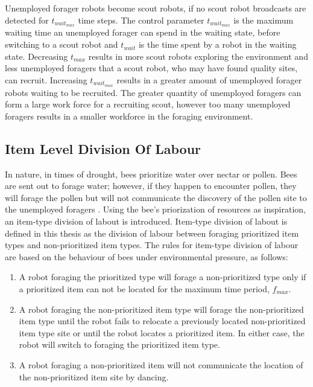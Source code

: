 Unemployed forager robots become scout robots, if no scout robot broadcasts are detected for $t_{wait_{max}}$ time steps. The control parameter $t_{wait_{max}}$ is the maximum waiting time an unemployed forager can spend in the waiting state, before switching to a scout robot and $t_{wait}$ is the time spent by a robot in the waiting state. Decreasing $t_{max}$ results in more scout robots exploring the environment and less unemployed foragers that a scout robot, who may have found quality sites, can recruit. Increasing $t_{wait_{max}}$ results in a greater amount of unemployed forager robots waiting to be recruited. The greater quantity of unemployed foragers can form a large work force for a recruiting scout, however too many unemployed foragers results in a smaller workforce in the foraging environment.


\subsection{Item Level Division Of Labour}
In nature, in times of drought, bees prioritize water over nectar or pollen. Bees are sent out to forage water; however, if they happen to encounter pollen, they will forage the pollen but will not communicate the discovery of the pollen site to the unemployed foragers  \cite{seeley2009wisdom}. Using the bee's priorization of resources as inspiration, an item-type division of labout is introduced. Item-type division of labout is defined in this thesis as the division of labour between foraging prioritized item types and non-prioritized item types.
The rules for item-type division of labour are based on the behaviour of bees under environmental pressure, as follows:

\begin{enumerate}
\item A robot foraging the prioritized type will forage a non-prioritized type only if a prioritized item can not be located for the maximum time period, $f_{max}$.
\item A robot foraging the non-prioritized item type will forage the non-prioritized item type until the robot fails to relocate a previously located non-prioritized item type site or until the robot locates a prioritized item. In either case, the robot will switch to foraging the prioritized item type.
\item A robot foraging a non-prioritized item will not communicate the location of the non-prioritized item site by dancing. 
\end{enumerate}

